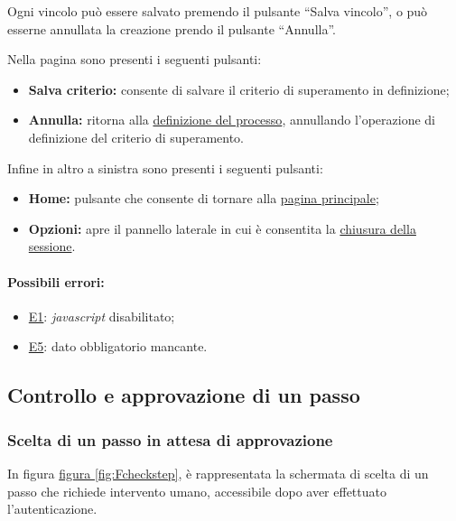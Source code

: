 Ogni vincolo può essere salvato premendo il pulsante ``Salva vincolo'', o può esserne annullata la creazione prendo il pulsante ``Annulla''.

Nella pagina sono presenti i seguenti pulsanti:
\begin{itemize}
\item \textbf{Salva criterio:} consente di salvare il criterio di superamento in definizione;
\item \textbf{Annulla:} ritorna alla \hyperref[newprocess]{definizione del processo}, annullando l'operazione di definizione del criterio di superamento.
\end{itemize}

Infine in altro a sinistra sono presenti i seguenti pulsanti:
\begin{itemize}
\item \textbf{Home:} pulsante che consente di tornare alla \hyperref[home]{pagina principale};
\item \textbf{Opzioni:} apre il pannello laterale in cui è consentita la \hyperref[logout]{chiusura della sessione}.
\end{itemize}

\paragraph*{Possibili errori:}
\begin{itemize}
\item \hyperref[e1]{E1}: \textit{javascript} disabilitato;
\item \hyperref[e5]{E5}: dato obbligatorio mancante.
\end{itemize}

\subsection{Controllo e approvazione di un passo}
\label{controllo}

\subsubsection{Scelta di un passo in attesa di approvazione}

In figura \hyperref[fig:Fcheckstep]{figura \ref{fig:Fcheckstep}}, è rappresentata la schermata di scelta di un passo che richiede intervento umano, accessibile dopo aver effettuato l'autenticazione.

